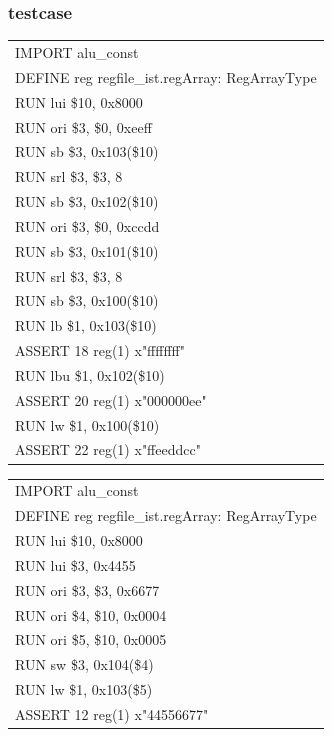 \documentclass[11pt,utf8]{article}
\begin{document}
{{{\subsubsection{testcase} {
\begin{center}	\begin{longtable}{p{15cm}} \hline
		IMPORT{ }alu\_const\\
		DEFINE{ }reg{ }regfile\_ist.regArray:{ }RegArrayType\\
		RUN{ }lui{ }\$10,{ }0x8000\\
		RUN{ }ori{ }\$3,{ }\$0,{ }0xeeff\\
		RUN{ }sb{ }{ }\$3,{ }0x103(\$10)\\
		RUN{ }srl{ }\$3,{ }\$3,{ }8\\
		RUN{ }sb{ }{ }\$3,{ }0x102(\$10)\\
		RUN{ }ori{ }\$3,{ }\$0,{ }0xccdd\\
		RUN{ }sb{ }{ }\$3,{ }0x101(\$10)\\
		RUN{ }srl{ }\$3,{ }\$3,{ }8\\
		RUN{ }sb{ }{ }\$3,{ }0x100(\$10)\\
		RUN{ }lb{ }{ }\$1,{ }0x103(\$10)\\
		ASSERT{ }18{ }reg(1){ }x"ffffffff"\\
		RUN{ }lbu{ }\$1,{ }0x102(\$10)\\
		ASSERT{ }20{ }reg(1){ }x"000000ee"\\
		RUN{ }lw{ }{ }\$1,{ }0x100(\$10)\\
		ASSERT{ }22{ }reg(1){ }x"ffeeddcc"\\
		\hline \end{longtable} \end{center}
\begin{center}	\begin{longtable}{p{15cm}} \hline
		IMPORT{ }alu\_const\\
		DEFINE{ }reg{ }regfile\_ist.regArray:{ }RegArrayType\\
		RUN{ }lui{ }\$10,{ }0x8000\\
		RUN{ }lui{ }\$3,{ }0x4455\\
		RUN{ }ori{ }\$3,{ }\$3,{ }0x6677\\
		RUN{ }ori{ }\$4,{ }\$10,{ }0x0004\\
		RUN{ }ori{ }\$5,{ }\$10,{ }0x0005\\
		RUN{ }sw{ }{ }\$3,{ }0x104(\$4)\\
		RUN{ }lw{ }{ }\$1,{ }0x103(\$5)\\
		ASSERT{ }12{ }reg(1){ }x"44556677"\\

\end{longtable}
\end{center}}}}}
\end{document}
